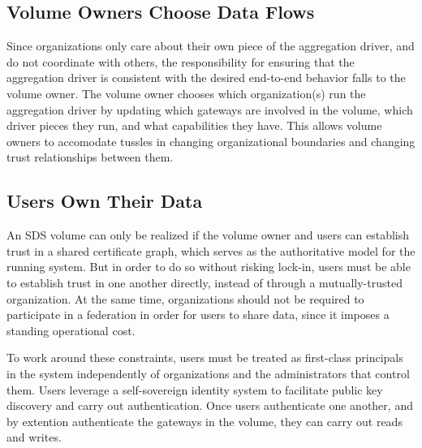 \subsection{Volume Owners Choose Data Flows}

Since organizations only care about their own piece of the aggregation driver,
and do not coordinate with others, the responsibility for ensuring that the
aggregation driver is consistent with the desired end-to-end behavior falls to
the volume owner.  The volume owner chooses which
organization(s) run the aggregation driver by updating which gateways are
involved in the volume, which driver pieces they run, and what capabilities they
have.  This allows volume owners to accomodate tussles in changing
organizational boundaries and changing trust relationships between them.

\subsection{Users Own Their Data}

An SDS volume can only be realized if the volume owner and users can establish
trust in a shared certificate graph, which serves as the authoritative model for
the running system.  But in order to do so without risking lock-in, users must
be able to establish trust in one another directly, instead of through a
mutually-trusted organization.  At the same time, organizations should not be
required to participate in a federation in order for users to share data, since
it imposes a standing operational cost.

To work around these constraints, users must be treated
as first-class principals in the system independently of organizations
and the administrators that control them.  Users leverage a self-sovereign identity
system to facilitate public key discovery and carry out authentication.  Once
users authenticate one another, and by extention authenticate the gateways in
the volume, they can carry out reads and writes.

